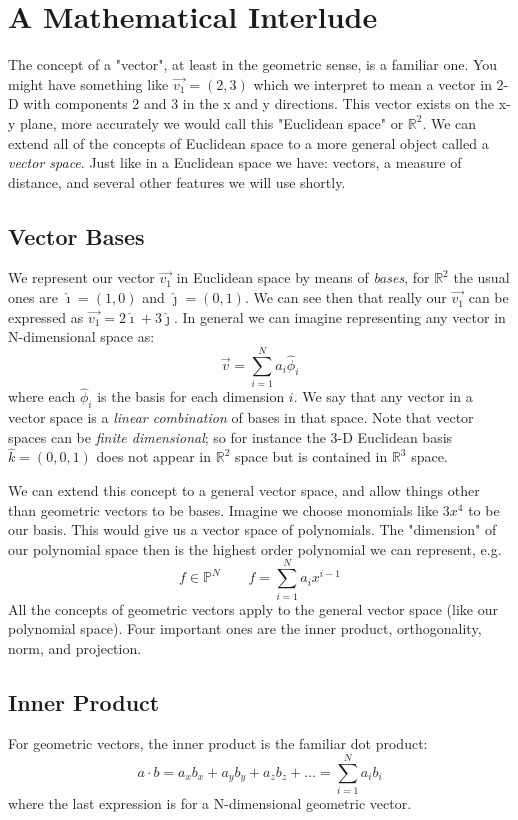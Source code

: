 \documentclass[letterpaper,12pt]{article}
\newcommand{\be}{\begin{equation}}
\newcommand{\ee}{\end{equation}}
\begin{document}
\section{A Mathematical Interlude}
The concept of a "vector", at least in the geometric sense, is a familiar one. You might have something like $\overrightarrow{v_1}=(2,3)$ which we interpret to mean a vector in 2-D with components 2 and 3 in the x and y directions. This vector exists on the x-y plane, more accurately we would call this "Euclidean space" or $\mathbb{R}^2$. We can extend all of the concepts of  Euclidean space to a more general object called a \textit{vector space}. Just like in a Euclidean space we have: vectors, a measure of distance, and several other features we will use shortly.

\subsection{Vector Bases}
We represent our vector $\overrightarrow{v_1}$ in Euclidean space by means of \textit{bases}, for $\mathbb{R}^2$ the usual ones are $\hat{\imath}=(1,0)$ and $\hat{\jmath}=(0,1)$. We can see then that really our $\overrightarrow{v_1}$ can be expressed as $\overrightarrow{v_1}=2\hat{\imath} + 3\hat{\jmath}$. In general we can imagine representing any vector in N-dimensional space as:
\be\overrightarrow{v}=\sum^N_{i=1} a_i\hat{\phi}_i\ee
where each $\hat{\phi}_i$ is the basis for each dimension $i$. We say that any vector in a vector space is a \textit{linear combination} of bases in that space. Note that vector spaces can be \textit{finite dimensional}; so for instance the 3-D Euclidean basis $\hat{k}=(0,0,1)$ does not appear in $\mathbb{R}^2$ space but is contained in $\mathbb{R}^3$ space.

We can extend this concept to a general vector space, and allow things other than geometric vectors to be bases. Imagine we choose monomials like $3x^4$ to be our basis. This would give us a vector space of polynomials. The "dimension" of our polynomial space then is the highest order polynomial we can represent, e.g.
\be f \in \mathbb{P}^N  \qquad f=\sum^N_{i=1} a_ix^{i-1}\ee
All the concepts of geometric vectors apply to the general vector space (like our polynomial space). Four important ones are the inner product, orthogonality, norm, and projection.

\subsection{Inner Product}
For geometric vectors, the inner product is the familiar dot product:
\be a \cdot b = a_x b_x + a_y b_y + a_z b_z + \ldots = \sum^N_{i=1} a_i b_i\ee
where the last expression is for a N-dimensional geometric vector.
\end{document}
